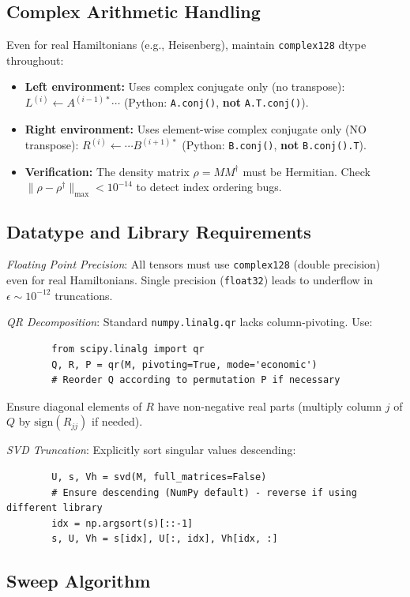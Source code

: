 \documentclass[aps,prb,onecolumn,scriptaddress]{revtex4-2}
\begin{document}
	\subsection{Complex Arithmetic Handling}
	Even for real Hamiltonians (e.g., Heisenberg), maintain \texttt{complex128} dtype throughout:
	\begin{itemize}
		\item \textbf{Left environment:} Uses complex conjugate only (no transpose):
		$L^{(i)} \gets A^{(i-1)*} \cdots$ (Python: \texttt{A.conj()}, \textbf{not} \texttt{A.T.conj()}).
		\item \textbf{Right environment:} Uses element-wise complex conjugate only (NO transpose): 
		$R^{(i)} \gets \cdots B^{(i+1)*}$ (Python: \texttt{B.conj()}, \textbf{not} \texttt{B.conj().T}).
		\item \textbf{Verification:} The density matrix $\rho = M M^\dagger$ must be Hermitian. 
		Check $\|\rho - \rho^\dagger\|_{\max} < 10^{-14}$ to detect index ordering bugs.
	\end{itemize}
	
	\subsection{Datatype and Library Requirements}
	
	\textit{Floating Point Precision}: All tensors must use \texttt{complex128} (double precision) even for real Hamiltonians. Single precision (\texttt{float32}) leads to underflow in $\epsilon \sim 10^{-12}$ truncations.
	
	\textit{QR Decomposition}: Standard \texttt{numpy.linalg.qr} lacks column-pivoting. Use:
	\begin{verbatim}
		from scipy.linalg import qr
		Q, R, P = qr(M, pivoting=True, mode='economic')
		# Reorder Q according to permutation P if necessary
	\end{verbatim}
	Ensure diagonal elements of $R$ have non-negative real parts (multiply column $j$ of $Q$ by $\text{sign}(R_{jj})$ if needed).
	
	\textit{SVD Truncation}: Explicitly sort singular values descending:
	\begin{verbatim}
		U, s, Vh = svd(M, full_matrices=False)
		# Ensure descending (NumPy default) - reverse if using different library
		idx = np.argsort(s)[::-1]
		s, U, Vh = s[idx], U[:, idx], Vh[idx, :]
	\end{verbatim}
	
	\subsection{Sweep Algorithm}
	
\end{document}
